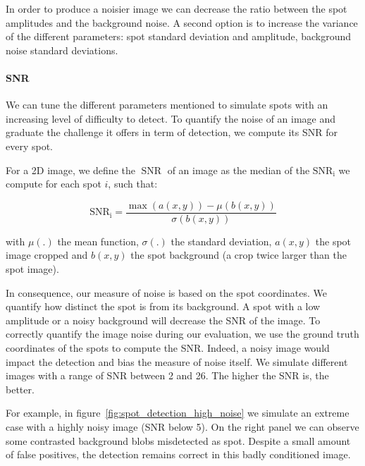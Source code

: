In order to produce a noisier image we can decrease the ratio between the spot amplitudes and the background noise.
A second option is to increase the variance of the different parameters: spot standard deviation and amplitude, background noise standard deviations.

\paragraph{\ac{SNR}}

We can tune the different parameters mentioned to simulate spots with an increasing level of difficulty to detect.
To quantify the noise of an image and graduate the challenge it offers in term of detection, we compute its \ac{SNR} for every spot.

\noindent
For a 2D image, we define the $\operatorname{SNR}$ of an image as the median of the $\operatorname{SNR_i}$ we compute for each spot $i$, such that:

\begin{equation}
	{\displaystyle \operatorname{SNR_i} = \frac{\max(a(x, y)) - \mu(b(x, y))}{\sigma(b(x, y))}}
\end{equation}

\noindent
with $\mu(.)$ the mean function, $\sigma(.)$ the standard deviation, $a(x, y)$ the spot image cropped and $b(x, y)$ the spot background (a crop twice larger than the spot image).

In consequence, our measure of noise is based on the spot coordinates.
We quantify how distinct the spot is from its background.
A spot with a low amplitude or a noisy background will decrease the \ac{SNR} of the image.
To correctly quantify the image noise during our evaluation, we use the ground truth coordinates of the spots to compute the \ac{SNR}.
Indeed, a noisy image would impact the detection and bias the measure of noise itself.
We simulate different images with a range of \ac{SNR} between 2 and 26.
The higher the \ac{SNR} is, the better.

For example, in figure~\ref{fig:spot_detection_high_noise} we simulate an extreme case with a highly noisy image (\ac{SNR} below 5).
On the right panel we can observe some contrasted background blobs misdetected as spot.
Despite a small amount of false positives, the detection remains correct in this badly conditioned image.

